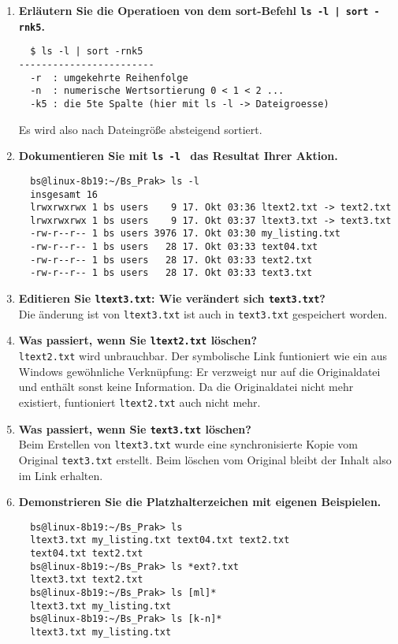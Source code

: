 \documentclass[
   draft=false
  ,paper=a4
  ,twoside=false
  ,fontsize=11pt
  ,headsepline
  ,BCOR10mm
  ,DIV11
]{scrartcl} %
\begin{document}
\begin{enumerate}
  \item \textbf{Erläutern Sie die Operatioen von dem sort-Befehl
  \texttt{ls -l | sort -rnk5}.}\\
  \begin{verbatim}
  $ ls -l | sort -rnk5
------------------------
  -r  : umgekehrte Reihenfolge
  -n  : numerische Wertsortierung 0 < 1 < 2 ...
  -k5 : die 5te Spalte (hier mit ls -l -> Dateigroesse)
  \end{verbatim}
  Es wird also nach Dateingröße absteigend sortiert.

  \item \textbf{Dokumentieren Sie mit \texttt{ls -l } das Resultat Ihrer
  Aktion.}\\
  \begin{verbatim}
  bs@linux-8b19:~/Bs_Prak> ls -l
  insgesamt 16
  lrwxrwxrwx 1 bs users    9 17. Okt 03:36 ltext2.txt -> text2.txt
  lrwxrwxrwx 1 bs users    9 17. Okt 03:37 ltext3.txt -> text3.txt
  -rw-r--r-- 1 bs users 3976 17. Okt 03:30 my_listing.txt
  -rw-r--r-- 1 bs users   28 17. Okt 03:33 text04.txt
  -rw-r--r-- 1 bs users   28 17. Okt 03:33 text2.txt
  -rw-r--r-- 1 bs users   28 17. Okt 03:33 text3.txt
  \end{verbatim}

  \item \textbf{Editieren Sie \texttt{ltext3.txt}: Wie verändert sich
  \texttt{text3.txt}?}\\
  Die änderung ist von \texttt{ltext3.txt} ist auch in \texttt{text3.txt}
   gespeichert worden.


  \item \textbf{Was passiert, wenn Sie \texttt{ltext2.txt} löschen?}\\
  \texttt{ltext2.txt} wird unbrauchbar. Der symbolische Link funtioniert wie
  ein aus Windows gewöhnliche Verknüpfung: Er verzweigt nur auf die
  Originaldatei und enthält sonst keine Information. Da die Originaldatei nicht
  mehr existiert, funtioniert \texttt{ltext2.txt} auch nicht mehr.

  \item \textbf{Was passiert, wenn Sie \texttt{text3.txt} löschen?}\\
  Beim Erstellen von \texttt{ltext3.txt} wurde eine synchronisierte Kopie
  vom Original \texttt{text3.txt} erstellt. Beim löschen vom Original bleibt
  der Inhalt also im Link erhalten.

  \item \textbf{Demonstrieren Sie die Platzhalterzeichen mit eigenen
  Beispielen.}\\
  \begin{verbatim}
  bs@linux-8b19:~/Bs_Prak> ls
  ltext3.txt my_listing.txt text04.txt text2.txt
  text04.txt text2.txt
  bs@linux-8b19:~/Bs_Prak> ls *ext?.txt
  ltext3.txt text2.txt
  bs@linux-8b19:~/Bs_Prak> ls [ml]*
  ltext3.txt my_listing.txt
  bs@linux-8b19:~/Bs_Prak> ls [k-n]*
  ltext3.txt my_listing.txt
  \end{verbatim}



\end{enumerate}
\end{document}
